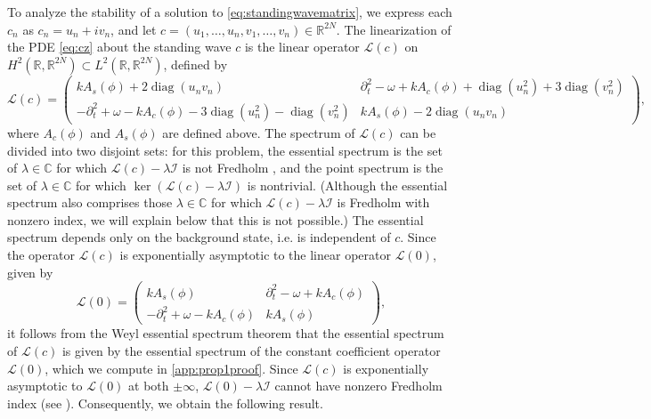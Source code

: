 \documentclass[11pt,reqno]{amsart}
\def\R{{\mathbb R}}
\def\C{{\mathbb C}}
\def\calI{{\mathcal I}}
\def\calL{{\mathcal L}}
\DeclareMathOperator{\diag}{diag}
\begin{document}
To analyze the stability of a solution to \cref{eq:standingwavematrix}, we express each $c_n$ as $c_n = u_n + i v_n$, and let $c = (u_1, \dots, u_n,v_1, \dots, v_n) \in \R^{2N}$. The linearization of the PDE \cref{eq:cz} about the standing wave $c$ is the linear operator $\calL(c)$ on $H^2(\R, \R^{2N}) \subset L^2(\R, \R^{2N})$, defined by 
\begin{equation}\label{eq:linc}
\calL(c) = \begin{pmatrix}
k A_s(\phi) + 2 \diag(u_n v_n) & \partial_t^2 - \omega + k A_c(\phi) + \diag(u_n^2) + 3 \diag(v_n^2) \\
-\partial_t^2 + \omega - k A_c(\phi) - 3\diag(u_n^2) - \diag(v_n^2) &
k A_s(\phi) - 2 \diag(u_n v_n)
\end{pmatrix},
\end{equation}
where $A_c(\phi)$ and $A_s(\phi)$ are defined above. The spectrum of $\calL(c) $ can be divided into two disjoint sets: for this problem, the essential spectrum is the set of $\lambda \in \C$ for which $\calL(c) - \lambda \calI$ is not Fredholm \cite[Section 3.1]{Kapitula2013}, and the point spectrum is the set of $\lambda \in \C$ for which $\ker( \calL(c) - \lambda \calI)$ is nontrivial. (Although the essential spectrum also comprises those $\lambda \in \C$ for which $\calL(c) - \lambda \calI$ is Fredholm with nonzero index, we will explain below that this is not possible.) The essential spectrum depends only on the background state, i.e. is independent of $c$. Since the operator $\calL(c)$ is exponentially asymptotic to the linear operator $\calL(0)$, given by
\begin{equation}\label{eq:L0}
\calL(0) = \begin{pmatrix}
k A_s(\phi) & \partial_t^2 - \omega + k A_c(\phi)  \\
-\partial_t^2 + \omega - k A_c(\phi) &
k A_s(\phi) 
\end{pmatrix},
\end{equation}
it follows from the Weyl essential spectrum theorem \cite[Theorem 2.2.6]{Kapitula2013} that the essential spectrum of $\calL(c)$ is given by the essential spectrum of the constant coefficient operator $\calL(0)$, which we compute in \cref{app:prop1proof}. Since $\calL(c)$ is exponentially asymptotic to $\calL(0)$ at both $\pm \infty$, $\calL(0) - \lambda \calI$ cannot have nonzero Fredholm index (see \cite[Lemma 3.1.10]{Kapitula2013}). Consequently, we obtain the following result.
\end{document}
